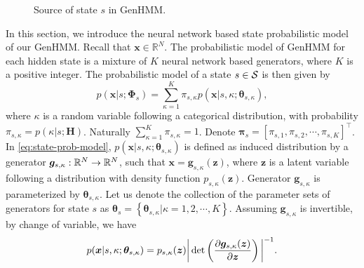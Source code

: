 \documentclass[letterpaper]{article} %
\begin{document}
\begin{figure}[!t]
  \centering
  \caption{Source of state $s$ in GenHMM.}
  \label{fig:gen-mix}
  \vspace{0.3cm}
\end{figure}

In this section, we introduce the neural network based state probabilistic model of our GenHMM.
Recall that $\bm{x}\in\mathbb{R}^N$.
The probabilistic model of GenHMM for each hidden state is a mixture of $K$ neural network based generators, where $K$ is a positive integer.
The probabilistic model of a state $s\in\mathcal{S}$ is then given by
\begin{equation}\label{eq:state-prob-model}
  p(\bm{x}| s; \bm{\Phi}_{s}) = \sum_{\kappa=1}^{K}\pi_{s, \kappa} p(\bm{x}| s, \kappa; \bm{\theta}_{s, \kappa}),
\end{equation}
where $\kappa$ is a random variable following a categorical distribution, with probability $\pi_{s, \kappa} = p(\kappa | s; \bm{H})$.
Naturally $\sum_{\kappa = 1}^{K} \pi_{s, \kappa}= 1$. Denote $\bm{\pi}_{s} = [\pi_{s,1}, \pi_{s,2}, \cdots, \pi_{s,K}]^{\intercal}$. 
In \eqref{eq:state-prob-model}, $p(\bm{x}| s, \kappa; \bm{\theta}_{s, \kappa})$ is defined as induced distribution by a generator $\bm{g}_{s,\kappa}: \mathbb{R}^{N}\rightarrow\mathbb{R}^{N}$, such that $\bm{x}=\bm{g}_{s, \kappa}(\bm{z})$, where $\bm{z}$ is a latent variable following a distribution with density function $p_{s,\kappa}(\bm{z})$. Generator $\bm{g}_{s,\kappa}$ is parameterized by $\bm{\theta}_{s, \kappa}$. Let us denote the collection of the parameter sets of generators for state $s$ as $\bm{\theta}_s = \left\{ \bm{\theta}_{s, \kappa}| \kappa = 1, 2, \cdots, K \right\}$. Assuming $\bm{g}_{s, \kappa}$ is invertible, by change of variable, we have
\begin{equation}\label{eq:changel-variable}
  p(\bm{x}| s, \kappa; \bm{\theta}_{s, \kappa}) = p_{s,\kappa}(\bm{z})\bigg| \det\left( \frac{ \partial \bm{g}_{s,\kappa}(\bm{z})}{\partial \bm{z}} \right)\bigg|^{-1}.
\end{equation}
\end{document}
